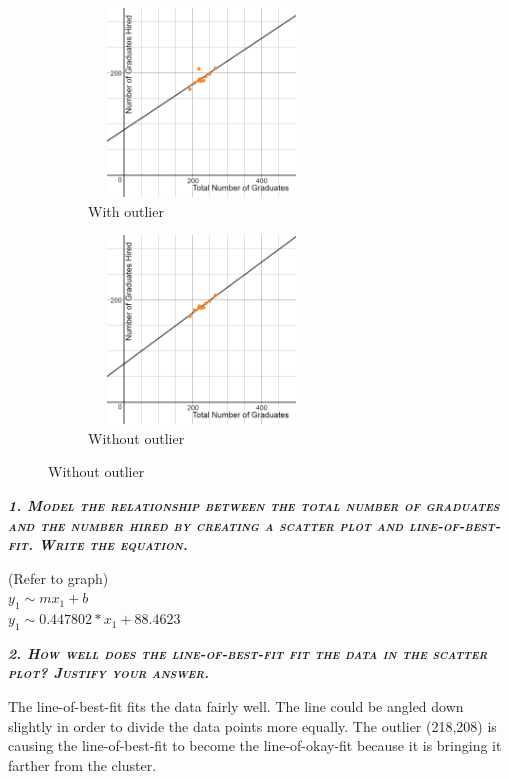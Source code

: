 \documentclass{article}
\begin{document}
\begin{figure}[h]
    \begin{subfigure}{0.5\textwidth}
        \begin{flushleft}
            \includegraphics[width=6cm, height=5cm]{parttwo-graph-with-outlier}
            \caption{With outlier}
        \end{flushleft}
    \end{subfigure}
    \begin{subfigure}{0.5\textwidth}
        \begin{flushright}
            \includegraphics[width=6cm, height=5cm]{parttwo-graph-without-outlier}
            \caption{Without outlier}
        \end{flushright}
    \end{subfigure}
\end{figure}

\textbf{\emph{\textsc{1. Model the relationship between the total number of graduates and the number hired by creating a scatter plot and line-of-best-fit. Write the equation.}}}

(Refer to graph) \\
$y_{1}\mathtt{\sim}mx_{1}+b$ \\
$y_{1}\mathtt{\sim}0.447802*x_{1}+88.4623$

\newpage

\textbf{\emph{\textsc{2. How well does the line-of-best-fit fit the data in the scatter plot? Justify your answer.}}}

The line-of-best-fit fits the data fairly well. The line could be angled down slightly in order to divide the data points more equally. The outlier (218,208) is causing the line-of-best-fit to become the line-of-okay-fit because it is bringing it farther from the cluster.
\end{document}
